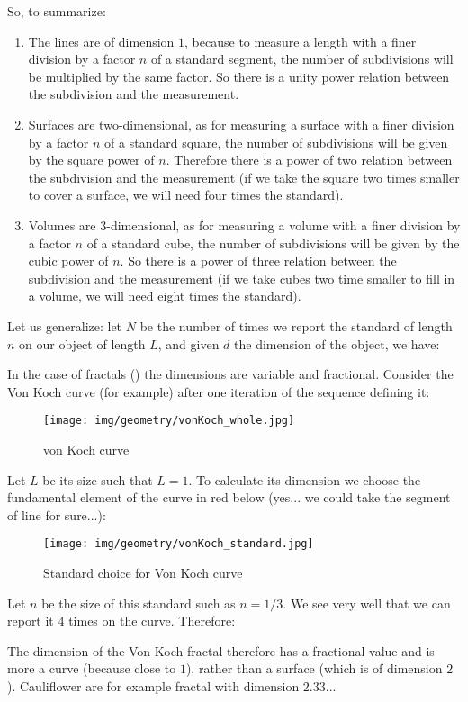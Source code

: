 	So, to summarize:
	\begin{enumerate}
		\item The lines are of dimension $1$, because to measure a length with a finer division by a factor $n$ of a standard segment, the number of subdivisions will be multiplied by the same factor. So there is a unity power relation between the subdivision and the measurement.
		
		\item Surfaces are two-dimensional, as for measuring a surface with a finer division by a factor $n$ of a standard square, the number of subdivisions will be given by the square power of $n$. Therefore there is a power of two relation between the subdivision and the measurement (if we take the square two times smaller to cover a surface, we will need four times the standard).
		
		\item Volumes are 3-dimensional, as for measuring a volume with a finer division by a factor $n$ of a standard cube, the number of subdivisions will be given by the cubic power of $n$. So there is a power of three relation between the subdivision and the measurement (if we take cubes two time smaller to fill in a volume, we will need eight times the standard).
	\end{enumerate}
	Let us generalize: let $N$ be the number of times we report the standard of length $n$ on our object of length $L$, and given $d$ the dimension of the object, we have:
	
	In the case of fractals () the dimensions are variable and fractional. Consider the Von Koch curve (for example) after one iteration of the sequence defining it:
	\begin{figure}[H]
		\centering
		\texttt{[image: img/geometry/vonKoch\_whole.jpg]}
		\caption{von Koch curve}
	\end{figure}
	Let $L$ be its size such that $L=1$. To calculate its dimension we choose the fundamental element of the curve in red below (yes... we could take the segment of line for sure...):
	\begin{figure}[H]
		\centering
		\texttt{[image: img/geometry/vonKoch\_standard.jpg]}
		\caption{Standard choice for Von Koch curve}
	\end{figure}
	Let $n$ be the size of this standard such as $n=1/3$. We see very well that we can report it $4$ times on the curve. Therefore:
	
	The dimension of the Von Koch fractal therefore has a fractional value and is more a curve (because close to $1$), rather than a surface (which is of dimension $2$). Cauliflower are for example fractal with dimension $2.33$...
	
